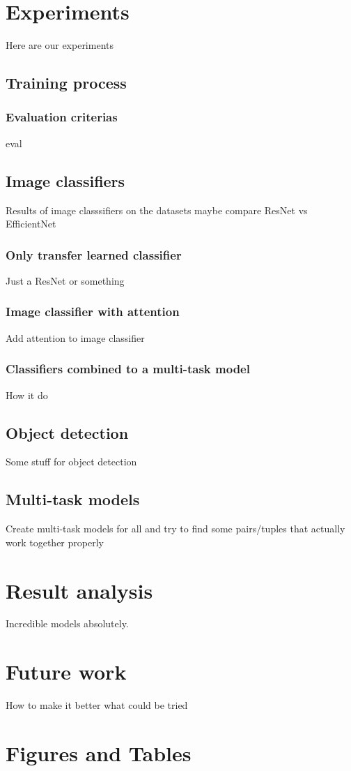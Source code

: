 \chapter{Experiments}
Here are our experiments
\section{Training process}
\subsection{Evaluation criterias}
eval
\section{Image classifiers}
Results of image classsifiers on the datasets maybe compare ResNet vs EfficientNet
\subsection{Only transfer learned classifier}
Just a ResNet or something
\subsection{Image classifier with attention}
Add attention to image classifier
\subsection{Classifiers combined to a multi-task model}
How it do
\section{Object detection}
Some stuff for object detection
\section{Multi-task models}
Create multi-task models for all and try to find some pairs/tuples that actually work together properly
\chapter{Result analysis}
Incredible models absolutely.

\chapter{Future work}
How to make it better what could be tried 

\chapter{Figures and Tables}

